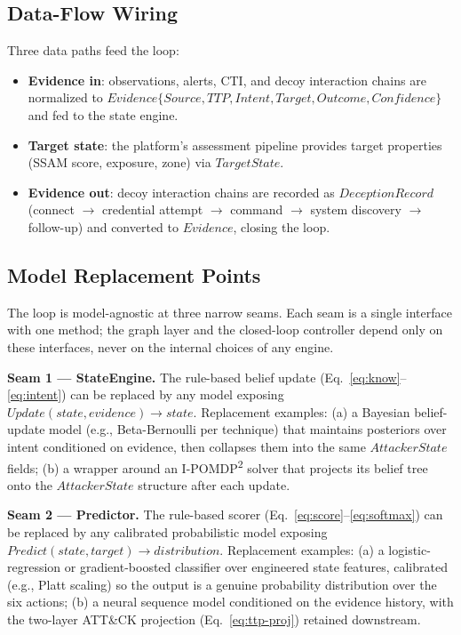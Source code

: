 \documentclass[11pt]{article}
\begin{document}
\subsection{Data-Flow Wiring}

Three data paths feed the loop:
\begin{itemize}
\item \textbf{Evidence in}: observations, alerts, CTI, and decoy interaction
      chains are normalized to
      $\mathit{Evidence}\{\mathit{Source},\mathit{TTP},\mathit{Intent},
      \mathit{Target},\mathit{Outcome},\mathit{Confidence}\}$ and fed to the
      state engine.
\item \textbf{Target state}: the platform's assessment pipeline provides
      target properties (SSAM score, exposure, zone) via
      $\mathit{TargetState}$.
\item \textbf{Evidence out}: decoy interaction chains are recorded as
      $\mathit{DeceptionRecord}$ (connect $\to$ credential attempt $\to$
      command $\to$ system discovery $\to$ follow-up) and converted to
      $\mathit{Evidence}$, closing the loop.
\end{itemize}

\subsection{Model Replacement Points}
\label{sec:replacement}

The loop is model-agnostic at three narrow seams. Each seam is a single
interface with one method; the graph layer and the closed-loop controller
depend only on these interfaces, never on the internal choices of any
engine.

\textbf{Seam 1 --- StateEngine.} The rule-based belief update
(Eq.~\ref{eq:know}--\ref{eq:intent}) can be replaced by any model exposing
$\mathit{Update}(\mathit{state}, \mathit{evidence})
\to \mathit{state}$. Replacement examples: (a) a Bayesian belief-update
model (e.g., Beta-Bernoulli per technique) that maintains posteriors over
intent conditioned on evidence, then collapses them into the same
$\mathit{AttackerState}$ fields; (b) a wrapper around an
I-POMDP\textsuperscript{2} solver that projects its belief tree onto the
$\mathit{AttackerState}$ structure after each update.

\textbf{Seam 2 --- Predictor.} The rule-based scorer
(Eq.~\ref{eq:score}--\ref{eq:softmax}) can be replaced by any calibrated
probabilistic model exposing
$\mathit{Predict}(\mathit{state}, \mathit{target}) \to
\mathit{distribution}$. Replacement examples: (a) a logistic-regression or
gradient-boosted classifier over engineered state features, calibrated
(e.g., Platt scaling) so the output is a genuine probability distribution
over the six actions; (b) a neural sequence model conditioned on the
evidence history, with the two-layer ATT\&CK projection
(Eq.~\ref{eq:ttp-proj}) retained downstream.
\end{document}
